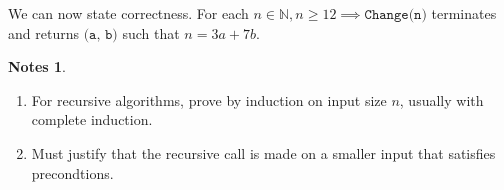 \documentclass{article}
\newcommand{\N}{\mathbb{N}}
\newtheorem{notes}{Notes}[example]
\begin{document}
We can now state correctness. For each $n \in \N, n \geq 12 \implies \texttt{Change(n)}$ terminates and returns $\texttt{(a, b)}$ such that $n = 3a + 7b$.

\begin{notes}
\end{notes}
\begin{enumerate}
    \item For recursive algorithms, prove by induction on input size $n$, usually with complete induction.
    \item Must justify that the recursive call is made on a smaller input that satisfies precondtions.
\end{enumerate}
\end{document}
